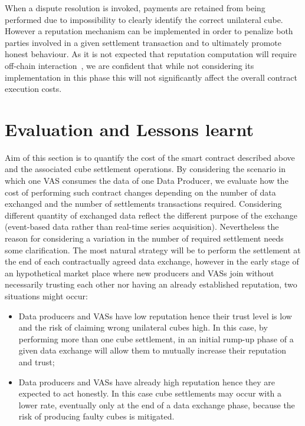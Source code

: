 When a dispute resolution is invoked, payments are retained from being performed due to impossibility to clearly identify the correct unilateral cube. However a reputation mechanism can be implemented in order to penalize both parties involved in a given settlement transaction and to ultimately promote honest behaviour. As it is not expected that reputation computation will require off-chain interaction~\cite{schaub2016trustless,carboni2015feedback}, we are confident that while not considering its implementation in this phase this will not significantly affect the overall contract execution costs.

\section{Evaluation and Lessons learnt}  \label{sec:evaluaton}

Aim of this section is to quantify the cost of the smart contract described above and the associated cube settlement operations. By considering the scenario in which one VAS consumes the data of one Data Producer, we evaluate how the cost of performing such contract changes depending on the number of data exchanged and the number of settlements transactions required. Considering different quantity of exchanged data reflect the different purpose of the exchange (event-based data rather than real-time series acquisition). Nevertheless the reason for considering a variation in the number of required settlement needs some clarification. The most natural strategy will be to perform the settlement at the end of each contractually agreed data exchange, however in the early stage of an hypothetical market place where new producers and VASs join without necessarily trusting each other nor having an already established reputation, two situations might occur:
\begin{itemize}
	\item {Data producers and VASs have low reputation hence their trust level is low and the risk of claiming wrong unilateral cubes high. In this case, by performing more than one cube settlement, in an initial rump-up phase of a given data exchange will allow them to mutually increase their reputation and trust;}
	\item {Data producers and VASs have already high reputation hence they are expected to act honestly. In this case cube settlements may occur with a lower rate, eventually only at the end of a data exchange phase, because the risk of producing faulty cubes is mitigated.}
\end{itemize}

